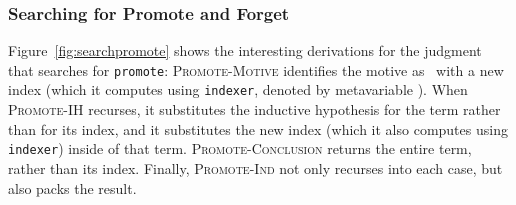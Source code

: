 \subsubsection{Searching for Promote and Forget}
Figure~\ref{fig:searchpromote} shows the interesting derivations for the judgment 
that searches for \lstinline{promote}:
\textsc{Promote-Motive} identifies the motive 
as \B\ with a new index (which it computes using \lstinline{indexer}, denoted by metavariable \smallmath{$\pi$}).
When \textsc{Promote-IH} recurses, it substitutes the inductive hypothesis for the term rather than
for its index, and it substitutes the new index (which it also computes using \lstinline{indexer}) inside of that term.
\textsc{Promote-Conclusion} returns the entire term, rather than its index.
Finally, \textsc{Promote-Ind} not only recurses into each case, but also packs the result.

